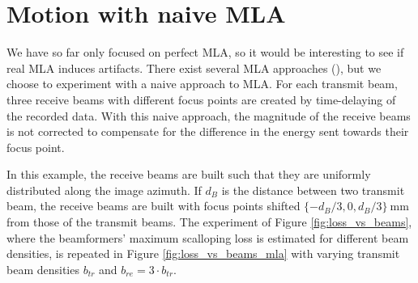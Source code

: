 
\section{Motion with naive MLA}
\label{sec:naive_mla}
We have so far only focused on perfect MLA, so it would be interesting to see if real MLA induces artifacts. There exist several MLA approaches (\cite{prb_approaches}), but we choose to experiment with a naive approach to MLA. For each transmit beam, three receive beams with different focus points are created by time-delaying of the recorded data. With this naive approach, the magnitude of the receive beams is not corrected to compensate for the difference in the energy sent towards their focus point.

In this example, the receive beams are built such that they are uniformly distributed along the image azimuth. If $d_B$ is the distance between two transmit beam, the receive beams are built with focus points shifted $\{-d_B/3, 0, d_B/3\}~$mm from those of the transmit beams.
The experiment of Figure \ref{fig:loss_vs_beams}, where the beamformers' maximum scalloping loss is estimated for different beam densities, is repeated in Figure \ref{fig:loss_vs_beams_mla} with varying transmit beam densities $b_{tr}$ and $b_{re} = 3 \cdot b_{tr}$.
